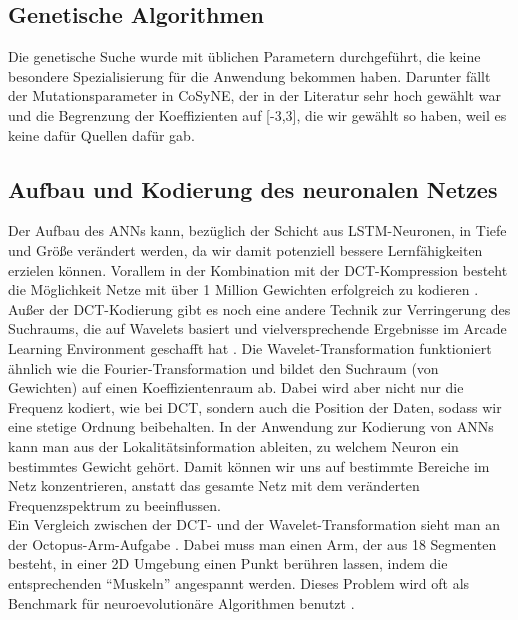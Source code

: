         \subsection*{Genetische Algorithmen}
            Die genetische Suche wurde mit üblichen Parametern durchgeführt, die keine besondere Spezialisierung für die Anwendung bekommen haben. Darunter fällt der Mutationsparameter in CoSyNE, der in der Literatur sehr hoch gewählt war \cite{cosyne2} und die Begrenzung der Koeffizienten auf [-3,3], die wir gewählt so haben, weil es keine dafür Quellen dafür gab.

        \subsection*{Aufbau und Kodierung des neuronalen Netzes}
            Der Aufbau des ANNs kann, bezüglich der Schicht aus LSTM-Neuronen, in Tiefe und Größe verändert werden, da wir damit potenziell bessere Lernfähigkeiten erzielen können. Vorallem in der Kombination mit der DCT-Kompression besteht die Möglichkeit Netze mit über 1 Million Gewichten erfolgreich zu kodieren \cite{cosyne4}. \\

            \noindent
            Außer der DCT-Kodierung gibt es noch eine andere Technik zur Verringerung des Suchraums, die auf Wavelets basiert und vielversprechende Ergebnisse im Arcade Learning Environment geschafft hat \cite{wavelet}. Die Wavelet-Transformation funktioniert ähnlich wie die Fourier-Transformation und bildet den Suchraum (von Gewichten) auf einen Koeffizientenraum ab. Dabei wird aber nicht nur die Frequenz kodiert, wie bei DCT, sondern auch die Position der Daten, sodass wir eine stetige Ordnung beibehalten. In der Anwendung zur Kodierung von ANNs kann man aus der Lokalitätsinformation ableiten, zu welchem Neuron ein bestimmtes Gewicht gehört. Damit können wir uns auf bestimmte Bereiche im Netz konzentrieren, anstatt das gesamte Netz mit dem veränderten Frequenzspektrum zu beeinflussen.\\

            \noindent
            Ein Vergleich zwischen der DCT- und der Wavelet-Transformation sieht man an der Octopus-Arm-Aufgabe \cite{wavelet}. Dabei muss man einen Arm, der aus 18 Segmenten besteht, in einer 2D Umgebung einen Punkt berühren lassen, indem die entsprechenden ``Muskeln'' angespannt werden. Dieses Problem wird oft als Benchmark für neuroevolutionäre Algorithmen benutzt \cite{cosyne1}\cite{cosyne4}\cite{wavelet}.

